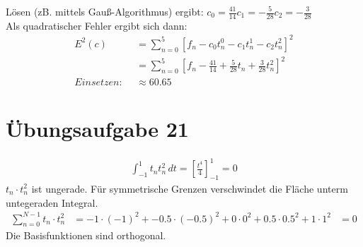     Lösen (zB. mittels Gauß-Algorithmus) ergibt: $c_0 = \frac{41}{14} c_1 = -\frac{5}{28} c_2 = -\frac{3}{28}$ \\
    Als quadratischer Fehler ergibt sich dann:
    \begin{align*}
        E^2(c) &= \sum_{n=0}^{5} \left[ f_n - c_0 t_n^0 - c_1 t_n^1 - c_2 t_n^2 \right]^2 \\
               &= \sum_{n=0}^{5} \left[ f_n - \frac{41}{14} + \frac{5}{28} t_n + \frac{3}{28} t_n^2 \right]^2 \\
        \textit{Einsetzen: } \; &\approx 60.65 
    \end{align*}
\newpage
    \section*{Übungsaufgabe 21}
    \begin{align*}
        \int_{-1}^{1} t_n t_n^2 \, dt = \left[ \frac{t^4}{4} \right]_{-1}^{1} = 0
    \end{align*}
    $t_n \cdot t_n^2$ ist ungerade. Für symmetrische Grenzen verschwindet die Fläche unterm untegeraden Integral.
    \begin{align*}
        \sum_{n=0}^{N-1} t_n \cdot t_n^2 &= -1 \cdot (-1)^2 + -0.5 \cdot (-0.5)^2 + 0 \cdot 0^2 + 0.5 \cdot 0.5^2 + 1 \cdot 1^2
            & = 0
    \end{align*}
    Die Basisfunktionen sind orthogonal.
\newpage